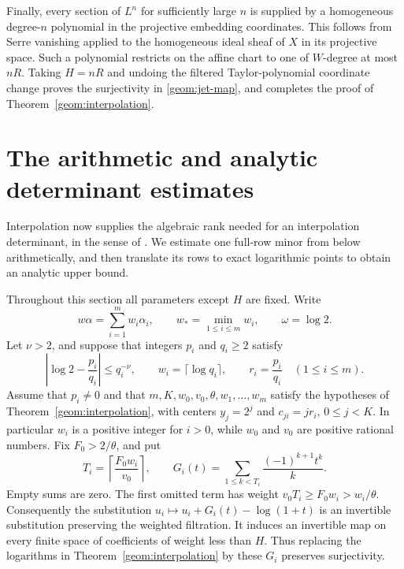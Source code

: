 \documentclass[11pt]{article}
\theoremstyle{definition}
\theoremstyle{remark}
\numberwithin{equation}{section}
\begin{document}
Finally, every section of $L^n$ for sufficiently large $n$ is
supplied by a homogeneous degree-$n$ polynomial in the projective
embedding coordinates. This follows from Serre vanishing applied
to the homogeneous ideal sheaf of $X$ in its projective space.
Such a polynomial restricts on the affine chart to one of
$W$-degree at most $nR$. Taking $H=nR$ and undoing the filtered
Taylor-polynomial coordinate change proves the surjectivity in
\eqref{geom:jet-map}, and completes the proof of
Theorem~\ref{geom:interpolation}.

\section{The arithmetic and analytic determinant estimates}
\label{det:section}

Interpolation now supplies the algebraic rank needed for an
interpolation determinant, in the sense of
\cite[Section~6]{laurent1991}. We estimate one full-row minor from
below arithmetically, and then translate its rows to exact logarithmic
points to obtain an analytic upper bound.

Throughout this section all parameters except $H$ are fixed.  Write
\[
 w\alpha=\sum_{i=1}^m w_i\alpha_i,
 \qquad w_* =\min_{1\le i\le m}w_i,
 \qquad \omega=\log 2.
\]
Let $\nu>2$, and suppose that integers $p_i$ and $q_i\ge2$ satisfy
\begin{equation}
 \left|\log 2-\frac{p_i}{q_i}\right|\le q_i^{-\nu},
 \qquad w_i=\lceil\log q_i\rceil,
 \qquad r_i=\frac{p_i}{q_i}
 \quad(1\le i\le m).
 \label{det:approximations}
\end{equation}
Assume that $p_i\ne0$ and that $m,K,w_0,v_0,\theta,w_1,\ldots,w_m$
satisfy the hypotheses of Theorem~\ref{geom:interpolation}, with centers
$y_j=2^j$ and $c_{ji}=jr_i$, $0\le j<K$.  In particular $w_i$ is a positive integer
for $i>0$, while $w_0$ and $v_0$ are positive rational numbers.  Fix
$F_0>2/\theta$, and put
\begin{equation}
 T_i=\left\lceil\frac{F_0w_i}{v_0}\right\rceil,
 \qquad
 G_i(t)=\sum_{1\le k<T_i}\frac{(-1)^{k+1}t^k}{k}.
 \label{det:truncations}
\end{equation}
Empty sums are zero.  The first omitted term has weight
$v_0T_i\ge F_0w_i>w_i/\theta$.  Consequently the substitution
$u_i\mapsto u_i+G_i(t)-\log(1+t)$ is an invertible substitution preserving
the weighted filtration.  It induces an invertible map on every finite
space of coefficients of weight less than $H$.  Thus replacing the
logarithms in Theorem~\ref{geom:interpolation} by these $G_i$ preserves
surjectivity.
\end{document}
